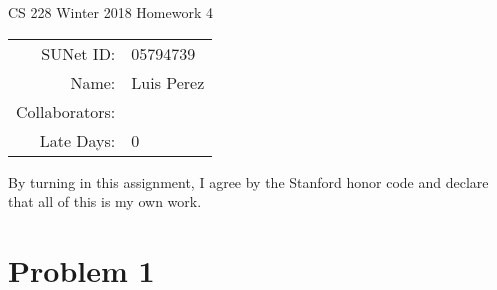 \documentclass[12pt]{article}
\begin{document}
\begin{center}
{\Large CS 228 Winter 2018 Homework 4}

\begin{tabular}{rl}
SUNet ID: & 05794739 \\
Name: & Luis Perez \\
Collaborators: & \\
Late Days: & 0
\end{tabular}
\end{center}

By turning in this assignment, I agree by the Stanford honor code and declare
that all of this is my own work.

\section*{Problem 1}
\end{document}
